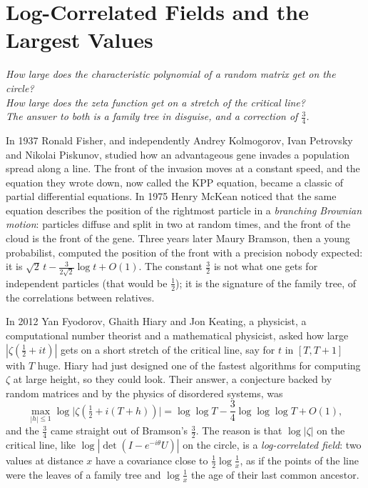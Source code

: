 \chapter{Log-Correlated Fields and the Largest Values}

\begin{center}\itshape
How large does the characteristic polynomial of a random matrix get on the circle?\\
How large does the zeta function get on a stretch of the critical line?\\
The answer to both is a family tree in disguise, and a correction of $\frac34$.
\end{center}

In 1937 Ronald Fisher, and independently Andrey Kolmogorov, Ivan Petrovsky and Nikolai Piskunov, studied how an advantageous gene invades a population spread along a line. The front of the invasion moves at a constant speed,
and the equation they wrote down, now called the KPP equation, became a classic of partial differential equations. In 1975 Henry McKean noticed that the same equation describes the position of the rightmost particle in a
\emph{branching Brownian motion}: particles diffuse and split in two at random times, and the front of the cloud is the front of the gene. Three years later Maury Bramson, then a young probabilist, computed the position of
the front with a precision nobody expected: it is $\sqrt2\,t-\frac3{2\sqrt2}\log t+O(1)$. The constant $\frac32$ is not what one gets for independent particles (that would be $\frac12$); it is the signature of the family tree, of the
correlations between relatives.

In 2012 Yan Fyodorov, Ghaith Hiary and Jon Keating, a physicist, a computational number theorist and a mathematical physicist, asked how large $|\zeta(\frac12+it)|$ gets on a short stretch of the critical line, say for $t$ in $[T,T+1]$ with
$T$ huge. Hiary had just designed one of the fastest algorithms for computing $\zeta$ at large height, so they could look. Their answer, a conjecture backed by random matrices and by the physics of disordered systems, was
\[
\max_{|h|\le1}\log\bigl|\zeta(\tfrac12+i(T+h))\bigr|=\log\log T-\frac34\log\log\log T+O(1),
\]
and the $\frac34$ came straight out of Bramson's $\frac32$. The reason is that $\log|\zeta|$ on the critical line, like $\log|\det(I-e^{-i\theta}U)|$ on the circle, is a \emph{log-correlated field}: two values at distance $x$ have a
covariance close to $\frac12\log\frac1x$, as if the points of the line were the leaves of a family tree and $\log\frac1x$ the age of their last common ancestor.

